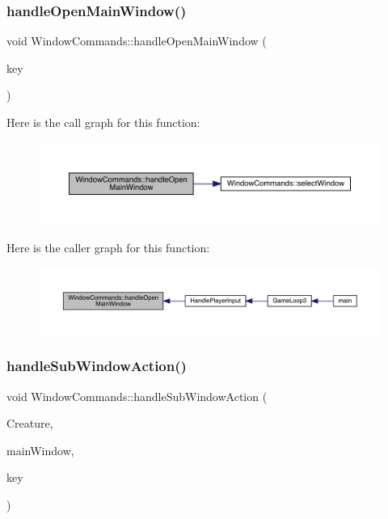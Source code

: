 \subsubsection{\texorpdfstring{handle\+Open\+Main\+Window()}{handleOpenMainWindow()}}
{\footnotesize\ttfamily void Window\+Commands\+::handle\+Open\+Main\+Window (\begin{DoxyParamCaption}\item[{sf\+::\+Keyboard\+::\+Key}]{key }\end{DoxyParamCaption})}

Here is the call graph for this function\+:
\nopagebreak
\begin{figure}[H]
\begin{center}
\leavevmode
\includegraphics[width=350pt]{da/d07/class_window_commands_a9b124a88e3af586738fe6b3cbce6fda2_cgraph}
\end{center}
\end{figure}
Here is the caller graph for this function\+:
\nopagebreak
\begin{figure}[H]
\begin{center}
\leavevmode
\includegraphics[width=350pt]{da/d07/class_window_commands_a9b124a88e3af586738fe6b3cbce6fda2_icgraph}
\end{center}
\end{figure}
\mbox{\label{class_window_commands_a1c45c8c693e631b581eeb355176a49e7}} 
\subsubsection{\texorpdfstring{handle\+Sub\+Window\+Action()}{handleSubWindowAction()}}
{\footnotesize\ttfamily void Window\+Commands\+::handle\+Sub\+Window\+Action (\begin{DoxyParamCaption}\item[{\mbox{\hyperlink{class_base_creature}{Base\+Creature}} \&}]{Creature,  }\item[{\mbox{\hyperlink{class_data_window}{Data\+Window}} \&}]{main\+Window,  }\item[{sf\+::\+Keyboard\+::\+Key}]{key }\end{DoxyParamCaption})}

